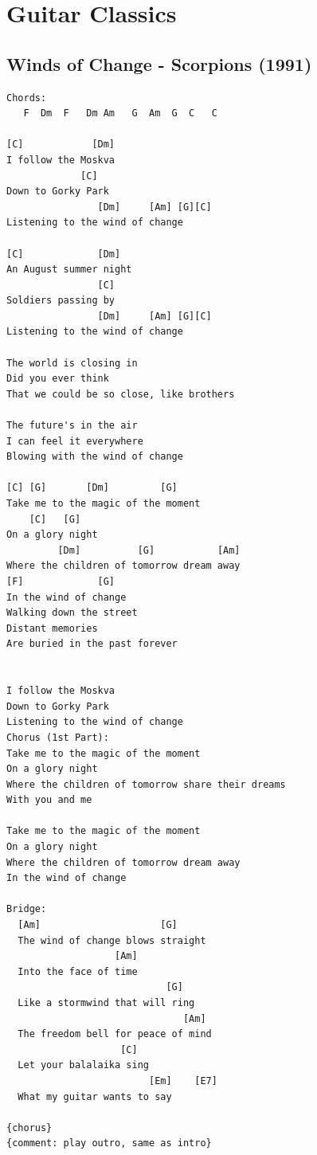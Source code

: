 \documentclass[
]{book}
\let\stdsection\section
\renewcommand\section{\clearpage\stdsection}
\begin{document}
\hypertarget{guitar-classics}{%
\chapter{Guitar Classics}\label{guitar-classics}}

\hypertarget{classics-wind-of-change}{%
\section{Winds of Change - Scorpions (1991)}\label{classics-wind-of-change}}

\begin{verbatim}
Chords:
   F  Dm  F   Dm Am   G  Am  G  C   C

[C]            [Dm]
I follow the Moskva
             [C]
Down to Gorky Park
                [Dm]     [Am] [G][C] 
Listening to the wind of change

[C]             [Dm]
An August summer night
                [C]
Soldiers passing by
                [Dm]     [Am] [G][C] 
Listening to the wind of change

The world is closing in
Did you ever think
That we could be so close, like brothers

The future's in the air
I can feel it everywhere
Blowing with the wind of change 

[C] [G]       [Dm]         [G]
Take me to the magic of the moment
    [C]   [G]
On a glory night
         [Dm]          [G]           [Am]
Where the children of tomorrow dream away
[F]             [G]
In the wind of change
Walking down the street
Distant memories
Are buried in the past forever


I follow the Moskva
Down to Gorky Park
Listening to the wind of change
Chorus (1st Part):
Take me to the magic of the moment
On a glory night
Where the children of tomorrow share their dreams
With you and me

Take me to the magic of the moment
On a glory night
Where the children of tomorrow dream away
In the wind of change

Bridge:
  [Am]                     [G]
  The wind of change blows straight
                   [Am]
  Into the face of time
                            [G]
  Like a stormwind that will ring
                               [Am]
  The freedom bell for peace of mind
                    [C]
  Let your balalaika sing
                         [Em]    [E7]
  What my guitar wants to say

{chorus}
{comment: play outro, same as intro}
\end{verbatim}
\end{document}
